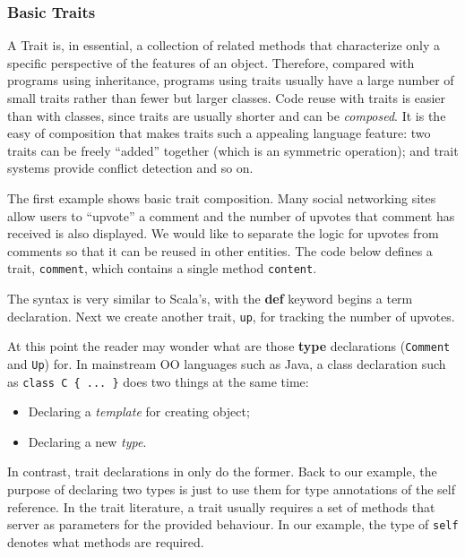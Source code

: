 \subsubsection{Basic Traits}

A Trait is, in essential, a collection of related methods that characterize only
a specific perspective of the features of an object. Therefore, compared with
programs using inheritance, programs using traits usually have a large number of
small traits rather than fewer but larger classes. Code reuse with traits is
easier than with classes, since traits are usually shorter and can be
\textit{composed}. It is the easy of composition that makes traits such a
appealing language feature: two traits can be freely ``added'' together (which
is an symmetric operation); and trait systems provide conflict detection and so
on.

The first example shows basic trait composition. Many social networking sites
allow users to ``upvote'' a comment and the number of upvotes that comment has
received is also displayed. We would like to separate the logic for upvotes from
comments so that it can be reused in other entities. The code below defines a
trait, \lstinline$comment$, which contains a single method \lstinline$content$.


The syntax is very similar to Scala's, with the \textbf{def} keyword begins a
term declaration. Next we create another trait, \lstinline$up$, for tracking the
number of upvotes.


At this point the reader may wonder what are those \textbf{type} declarations
(\lstinline$Comment$ and \lstinline$Up$) for. In mainstream OO languages such as
Java, a class declaration such as \lstinline$class C { ... }$ does two things at
the same time:

\begin{itemize}
\item Declaring a \textit{template} for creating object;
\item Declaring a new \textit{type}.
\end{itemize}

In contrast, trait declarations in \name only do the former. Back to our
example, the purpose of declaring two types is just to use them for type
annotations of the self reference. In the trait literature, a trait usually
requires a set of methods that server as parameters for the provided behaviour.
In our example, the type of \lstinline$self$ denotes what methods are required.

